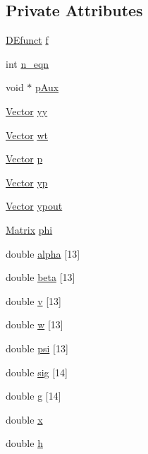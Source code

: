 \subsection*{Private Attributes}
\begin{DoxyCompactItemize}
\item 
\hyperlink{SAT__DE_8h_a37c3f0fc3c33a5b858a3f1c90353da48}{D\-Efunct} \hyperlink{classDE_afa7fefa0ba10ee635a618b3a4a5a39dc}{f}
\item 
int \hyperlink{classDE_ae74a30c7f5448d96d8460b4fde65f849}{n\-\_\-eqn}
\item 
void $\ast$ \hyperlink{classDE_ab8fad10a55cec3f9755444ae5ee38903}{p\-Aux}
\item 
\hyperlink{classVector}{Vector} \hyperlink{classDE_ab501e078b2408ca63ee44c1c4d59de86}{yy}
\item 
\hyperlink{classVector}{Vector} \hyperlink{classDE_adc470cb3c810cd47c8603003f10d4cac}{wt}
\item 
\hyperlink{classVector}{Vector} \hyperlink{classDE_af16ce45fb590ddb2ae5225b5cfc95f87}{p}
\item 
\hyperlink{classVector}{Vector} \hyperlink{classDE_acff3aaf84faff7827daf981587ef5b03}{yp}
\item 
\hyperlink{classVector}{Vector} \hyperlink{classDE_a985edfb71c582371040affbd4230a36a}{ypout}
\item 
\hyperlink{classMatrix}{Matrix} \hyperlink{classDE_a79eb189fb7f3320d735b90ca3332311e}{phi}
\item 
double \hyperlink{classDE_ad0bf62cec063071d0773fde29d976c0e}{alpha} \mbox{[}13\mbox{]}
\item 
double \hyperlink{classDE_a6db4afe37f9ebf0dce0532415c40de32}{beta} \mbox{[}13\mbox{]}
\item 
double \hyperlink{classDE_af4b92bb3bf10322b581dbbcf778ef5d5}{v} \mbox{[}13\mbox{]}
\item 
double \hyperlink{classDE_a4cd9f3da02faec86f2926ce373a4e7c9}{w} \mbox{[}13\mbox{]}
\item 
double \hyperlink{classDE_a7ef55ab5c646e5f540adcfa6ed392b56}{psi} \mbox{[}13\mbox{]}
\item 
double \hyperlink{classDE_a2ec1db657ea1d2ba57e0221ca0cb3eef}{sig} \mbox{[}14\mbox{]}
\item 
double \hyperlink{classDE_aa5b66f7465475382f7f2d757fd9cf979}{g} \mbox{[}14\mbox{]}
\item 
double \hyperlink{classDE_a53686f8f7ab89225ba80835e910168fa}{x}
\item 
double \hyperlink{classDE_adcd1d27f91dc1de8c4e2e8572878f92f}{h}

\end{DoxyCompactItemize}
